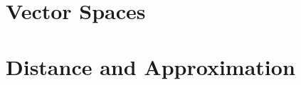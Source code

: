   \chapter{Vector Spaces}
    
    
    
    
    
    
    

  \chapter{Distance and Approximation}
    
    
    
    
    

